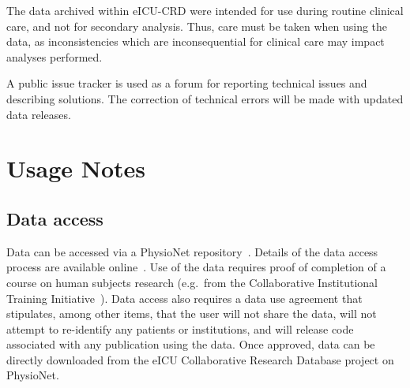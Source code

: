 \documentclass[english]{article}
\begin{document}
The data archived within eICU-CRD were intended for use during routine clinical care, and not for secondary analysis. Thus, care must be taken when using the data, as inconsistencies which are inconsequential for clinical care may impact analyses performed.

A public issue tracker is used as a forum for reporting technical issues
and describing solutions. The correction of
technical errors will be made with updated data releases.

\section*{Usage Notes}\label{usage-notes}



\subsection*{Data access}\label{data-access}

Data can be accessed via a PhysioNet repository~\cite{physionet-ref}.
Details of the data access process are available online~\cite{eicu-website}.
Use of the data requires proof of completion of a course on human subjects research (e.g.~from the Collaborative Institutional Training Initiative~\cite{citicourse}).
Data access also requires a data use agreement that stipulates, among other items, that the user will not share the data, will not attempt to re-identify any patients or institutions, and will release code associated with any publication using the data. Once approved, data can be directly downloaded from the eICU Collaborative Research Database project on PhysioNet.
\end{document}
